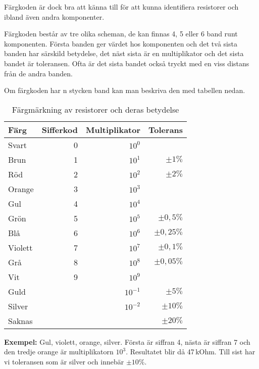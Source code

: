 Färgkoden är dock bra att känna till för att kunna identifiera resistorer
och ibland även andra komponenter.

Färgkoden består av tre olika scheman, de kan finnas 4, 5 eller 6 band runt
komponenten.
Första banden ger värdet hos komponenten och det två sista banden har särskild
betydelse, det näst sista är en multiplikator och det sista bandet är
toleransen.
Ofta är det sista bandet också tryckt med en viss distans från de andra banden.

Om färgkoden har n stycken band kan man beskriva den med tabellen nedan.

\begin{table}[H]
\begin{tabular}{lrrr}
	\textbf{Färg}    & \textbf{Sifferkod} &     \textbf{Multiplikator} 
	&     \textbf{Tolerans} \\ \hline \hline
	Svart   &         0 &    $10^0$ &              \\ \hline
	Brun    &         1 &    $10^1$ &    $\pm 1\%$ \\ \hline
	Röd     &         2 &    $10^2$ &    $\pm 2\%$ \\ \hline
	Orange  &         3 &    $10^3$ &              \\ \hline
	Gul     &         4 &    $10^4$ &              \\ \hline
	Grön    &         5 &    $10^5$ &  $\pm 0,5\%$ \\ \hline
	Blå     &         6 &    $10^6$ & $\pm 0,25\%$ \\ \hline
	Violett &         7 &    $10^7$ &  $\pm 0,1\%$ \\ \hline
	Grå     &         8 &    $10^8$ & $\pm 0,05\%$ \\ \hline
	Vit     &         9 &    $10^9$ &              \\ \hline
	Guld    &           & $10^{-1}$ &    $\pm 5\%$ \\ \hline
	Silver  &           & $10^{-2}$ &   $\pm 10\%$ \\ \hline
	Saknas  &           &           &   $\pm 20\%$ \\ \hline
\end{tabular}
\caption{Färgmärkning av resistorer och deras betydelse}
\end{table}

\textbf{Exempel:} Gul, violett, orange, silver. Första är siffran 4, nästa är siffran 7 och den tredje orange är multiplikatorn $10^3$. Resultatet blir då 47\,kOhm. Till sist har vi toleransen som är silver och innebär $\pm 10\%$.

